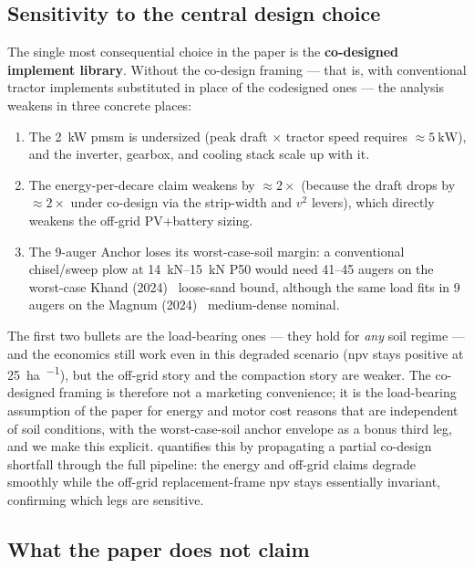 \documentclass[11pt,a4paper]{article}
\begin{document}
\subsection{Sensitivity to the central design choice}\label{sec:codesign-sensitivity}

The single most consequential choice in the paper is the \textbf{co-designed implement library}. Without the co-design framing --- that is, with conventional tractor implements substituted in place of the codesigned ones --- the analysis weakens in three concrete places:

\begin{enumerate}[leftmargin=1.6em,itemsep=0.1em]
    \item The \SI{2}{\kilo\watt} \gls{pmsm} is undersized (peak draft $\times$ tractor speed requires ${\approx}\SI{5}{\kilo\watt}$), and the inverter, gearbox, and cooling stack scale up with it.
    \item The energy-per-decare claim weakens by ${\approx}2\times$ (because the draft drops by ${\approx}2\times$ under co-design via the strip-width and $v^2$ levers), which directly weakens the off-grid PV+battery sizing.
    \item The 9-auger Anchor loses its worst-case-soil margin: a conventional chisel/sweep plow at \SIrange{14}{15}{\kilo\newton} P50 would need 41--45 augers on the worst-case Khand (2024)~\cite{khand2024helical} loose-sand bound, although the same load fits in 9 augers on the Magnum (2024)~\cite{magnum2024fixed} medium-dense nominal.
\end{enumerate}

The first two bullets are the load-bearing ones --- they hold for \emph{any} soil regime --- and the economics still work even in this degraded scenario (\gls{npv} stays positive at \SI{25}{\hectare\per\year}), but the off-grid story and the compaction story are weaker. The co-designed framing is therefore not a marketing convenience; it is the load-bearing assumption of the paper for energy and motor cost reasons that are independent of soil conditions, with the worst-case-soil anchor envelope as a bonus third leg, and we make this explicit.  quantifies this by propagating a partial co-design shortfall through the full pipeline: the energy and off-grid claims degrade smoothly while the off-grid replacement-frame \gls{npv} stays essentially invariant, confirming which legs are sensitive.

\subsection{What the paper does not claim}\label{sec:not-claim}
\end{document}
